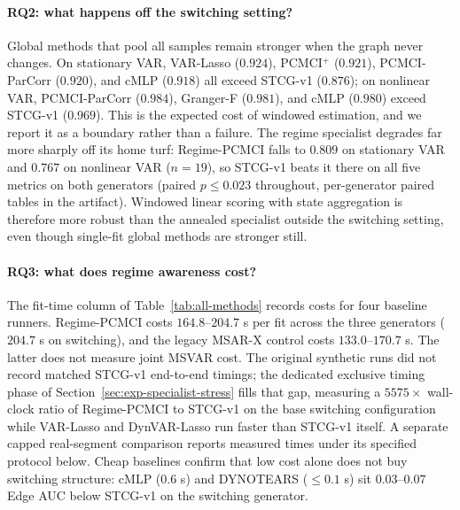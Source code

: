 \documentclass[sigconf,anonymous]{acmart}
\begin{document}
\begin{table}[t]
\caption{Paired STCG-v1 Edge AUC against every opponent on switching-regime recovery (twenty shared seeds, sorted by opponent mean). Positive improvement means STCG-v1 is better. All opponents except Regime-PCMCI lose significantly under both tests.}
\label{tab:paired-edge-matrix}
\centering
\small
\resizebox{\linewidth}{!}{}
\end{table}

\paragraph{RQ2: what happens off the switching setting?}
Global methods that pool all samples remain stronger when the graph never changes.
On stationary VAR, VAR-Lasso ($0.924$), PCMCI$^+$ ($0.921$), PCMCI-ParCorr ($0.920$), and cMLP ($0.918$) all exceed STCG-v1 ($0.876$); on nonlinear VAR, PCMCI-ParCorr ($0.984$), Granger-F ($0.981$), and cMLP ($0.980$) exceed STCG-v1 ($0.969$).
This is the expected cost of windowed estimation, and we report it as a boundary rather than a failure.
The regime specialist degrades far more sharply off its home turf: Regime-PCMCI falls to $0.809$ on stationary VAR and $0.767$ on nonlinear VAR ($n{=}19$), so STCG-v1 beats it there on all five metrics on both generators (paired $p \leq 0.023$ throughout, per-generator paired tables in the artifact).
Windowed linear scoring with state aggregation is therefore more robust than the annealed specialist outside the switching setting, even though single-fit global methods are stronger still.

\paragraph{RQ3: what does regime awareness cost?}
The fit-time column of Table~\ref{tab:all-methods} records costs for four baseline runners.
Regime-PCMCI costs $164.8$--$204.7$ s per fit across the three generators ($204.7$ s on switching), and the legacy MSAR-X control costs $133.0$--$170.7$ s. The latter does not measure joint MSVAR cost. The original synthetic runs did not record matched STCG-v1 end-to-end timings; the dedicated exclusive timing phase of Section~\ref{sec:exp-specialist-stress} fills that gap, measuring a $5575\times$ wall-clock ratio of Regime-PCMCI to STCG-v1 on the base switching configuration while VAR-Lasso and DynVAR-Lasso run faster than STCG-v1 itself. A separate capped real-segment comparison reports measured times under its specified protocol below.
Cheap baselines confirm that low cost alone does not buy switching structure: cMLP ($0.6$ s) and DYNOTEARS ($\leq 0.1$ s) sit $0.03$--$0.07$ Edge AUC below STCG-v1 on the switching generator.
\end{document}
